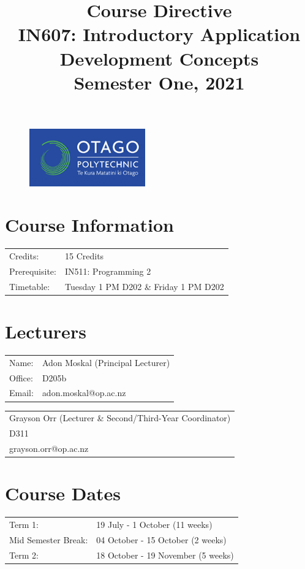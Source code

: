 \documentclass{article}
\author{}
\begin{document}
\begin{figure}
	\includegraphics[width=50mm]{../img/logo.png} 
\end{figure}

\title{Course Directive\\IN607: Introductory Application Development Concepts\\Semester One, 2021}
\date{}
\maketitle

\section*{Course Information}
\begin{tabular}{ll}
	Credits:            & 15 Credits                             \\
	Prerequisite:       & IN511: Programming 2                   \\
	Timetable:  & Tuesday 1 PM D202 \& Friday 1 PM D202       
\end{tabular} 

\section*{Lecturers}
\begin{tabular}{ll}
	Name:   & Adon Moskal (Principal Lecturer) \\
	Office: & D205b                            \\
	Email:  & adon.moskal@op.ac.nz             \\
\end{tabular}
\begin{tabular}{l}
	Grayson Orr (Lecturer \& Second/Third-Year Coordinator) \\
	D311                   \\
	grayson.orr@op.ac.nz   \\
\end{tabular}

\section*{Course Dates}
\begin{tabular}{ll} 
	Term 1:             & 19 July - 1 October (11 weeks) \\
	Mid Semester Break: & 04 October - 15 October (2 weeks)    \\
	Term 2:             & 18 October - 19 November (5 weeks)          
\end{tabular}
\end{document}
